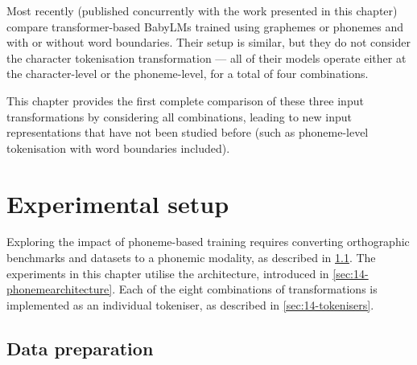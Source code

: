Most recently (published concurrently with the work presented in this chapter) \citet{bunzeck-etal-2025-small} compare transformer-based BabyLMs trained using graphemes or phonemes and with or without word boundaries. Their setup is similar, but they do not consider the character tokenisation transformation --- all of their models operate either at the character-level or the phoneme-level, for a total of four combinations. %

This chapter provides the first complete comparison of these three input transformations by considering all combinations, leading to new input representations that have not been studied before (such as phoneme-level tokenisation with word boundaries included). 



\section{Experimental setup}\label{sec:14-lmsetup}

Exploring the impact of phoneme-based training requires converting orthographic benchmarks and datasets to a phonemic modality, as described in \cref{sec:14-datapreparation}. The experiments in this chapter utilise the \gpt architecture, introduced in \cref{sec:14-phonemearchitecture}. Each of the eight combinations of transformations is implemented as an individual tokeniser, as described in \cref{sec:14-tokenisers}.

\subsection{Data preparation}\label{sec:14-datapreparation}

